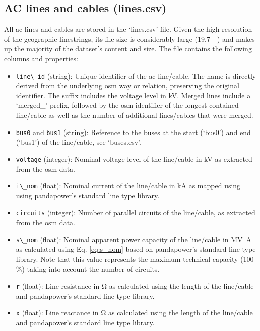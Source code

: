 \documentclass[fleqn,10pt]{wlscirep}
\let\autocite\cite
\newcommand{\colorcode}[1]{\colorbox{gray!20}{\lstinline|#1|}}
\begin{document}
\subsection*{AC lines and cables (lines.csv)}
All \acrshort{ac} lines and cables are stored in the `lines.csv' file. Given the high resolution of the geographic linestrings, its file size is considerably large (\SI{19.7}{\mega\byte}) and makes up the majority of the dataset's content and size. The file contains the following columns and properties:
\begin{itemize}
    \item \colorcode{line\_id} (string): Unique identifier of the \acrshort{ac} line/cable. The name is directly derived from the underlying \acrshort{osm} way or relation, preserving the original identifier. The suffix includes the voltage level in \si{\kilo\volt}. Merged lines include a `merged\_' prefix, followed by the \acrshort{osm} identifier of the longest contained line/cable as well as the number of additional lines/cables that were merged.
    \item \colorcode{bus0} and \colorcode{bus1} (string): Reference to the buses at the start (`bus0') and end (`bus1') of the line/cable, see `buses.csv'.
    \item \colorcode{voltage} (integer): Nominal voltage level of the line/cable in \si{\kilo\volt} as extracted from the \acrshort{osm} data.
    \item \colorcode{i\_nom} (float): Nominal current of the line/cable in \si{\kilo\ampere} as mapped using using pandapower's standard line type library.\autocite{thurnerPandapowerOpenSourcePython2018}
    \item \colorcode{circuits} (integer): Number of parallel circuits of the line/cable, as extracted from the \acrshort{osm} data.
    \item \colorcode{s\_nom} (float): Nominal apparent power capacity of the line/cable in \si{\mega\volt\ampere} as calculated using Eq. \ref{eq:s_nom} based on pandapower's standard line type library.\autocite{thurnerPandapowerOpenSourcePython2018} Note that this value represents the maximum technical capacity (100 \%) taking into account the number of circuits.
    \item \colorcode{r} (float): Line resistance in \si{\ohm} as calculated using the length of the line/cable and pandapower's standard line type library.\autocite{thurnerPandapowerOpenSourcePython2018}
    \item \colorcode{x} (float): Line reactance in \si{\ohm} as calculated using the length of the line/cable and pandapower's standard line type library.\autocite{thurnerPandapowerOpenSourcePython2018}

\end{itemize}
\end{document}
